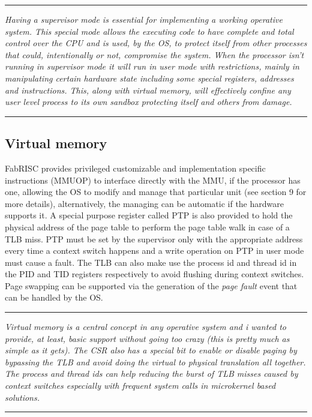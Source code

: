     \par\noindent\rule{\textwidth}{0.4pt}
    \textit{Having a supervisor mode is essential for implementing a working operative system. This special mode allows the executing code to have complete and total control over the CPU and is used, by the OS, to protect itself from other processes that could, intentionally or not, compromise the system. When the processor isn't running in supervisor mode it will run in user mode with restrictions, mainly in manipulating certain hardware state including some special registers, addresses and instructions. This, along with virtual memory, will effectively confine any user level process to its own sandbox protecting itself and others from damage.}
    \par\noindent\rule{\textwidth}{0.4pt}

    \subsection{Virtual memory}

        \vspace{10pt}

        FabRISC provides privileged customizable and implementation specific instructions (MMUOP) to interface directly with the MMU, if the processor has one, allowing the OS to modify and manage that particular unit (see section 9 for more details), alternatively, the managing can be automatic if the hardware supports it. A special purpose register called PTP is also provided to hold the physical address of the page table to perform the page table walk in case of a TLB miss. PTP must be set by the supervisor only with the appropriate address every time a context switch happens and a write operation on PTP in user mode must cause a fault. The TLB can also make use the process id and thread id in the PID and TID registers respectively to avoid flushing during context switches. Page swapping can be supported via the generation of the \textit{page fault} event that can be handled by the OS.

    \par\noindent\rule{\textwidth}{0.4pt}
    \textit{Virtual memory is a central concept in any operative system and i wanted to provide, at least, basic support without going too crazy (this is pretty much as simple as it gets). The CSR also has a special bit to enable or disable paging by bypassing the TLB and avoid doing the virtual to physical translation all together. The process and thread ids can help reducing the burst of TLB misses caused by context switches especially with frequent system calls in microkernel based solutions.}
    \par\noindent\rule{\textwidth}{0.4pt}

